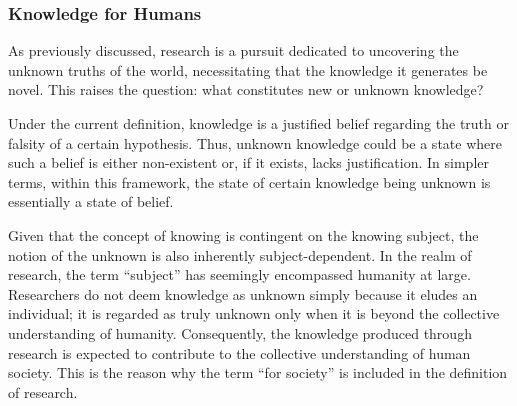 \subsubsection{Knowledge for Humans}
As previously discussed, research is a pursuit dedicated to uncovering the unknown truths of the world, necessitating that the knowledge it generates be novel. This raises the question: what constitutes new or unknown knowledge?

Under the current definition, knowledge is a justified belief regarding the truth or falsity of a certain hypothesis. Thus, unknown knowledge could be a state where such a belief is either non-existent or, if it exists, lacks justification. In simpler terms, within this framework, the state of certain knowledge being unknown is essentially a state of belief.

Given that the concept of knowing is contingent on the knowing subject, the notion of the unknown is also inherently subject-dependent. In the realm of research, the term ``subject'' has seemingly encompassed humanity at large. Researchers do not deem knowledge as unknown simply because it eludes an individual; it is regarded as truly unknown only when it is beyond the collective understanding of humanity. Consequently, the knowledge produced through research is expected to contribute to the collective understanding of human society. This is the reason why the term ``for society'' is included in the definition of research.




